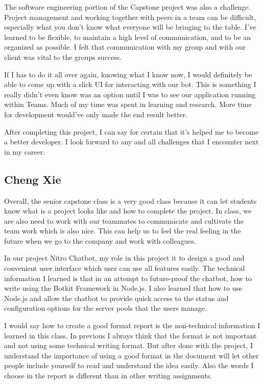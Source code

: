 \documentclass[onecolumn, draftclsnofoot,10pt, compsoc]{IEEEtran}
\begin{document}
    The software engineering portion of the Capstone project was also a challenge.
    Project management and working together with peers in a team can be difficult, especially what you don't know what everyone will be bringing to the table.
    I've learned to be flexible, to maintain a high level of communication, and to be an organized as possible.
    I felt that communication with my group and with our client was vital to the groups success.
    
    If I has to do it all over again, knowing what I know now, I would definitely be able to come up with a slick UI for interacting with our bot.
    This is something I really didn't even know was an option until I was to see our application running within Teams.
    Much of my time was spent in learning and research. 
    More time for development would've only made the end result better.
    
    After completing this project, I can say for certain that it's helped me to become a better developer.
    I look forward to any and all challenges that I encounter next in my career.

\subsection{Cheng Xie}
    Overall, the senior capstone class is a very good class because it can let students know what is a project looks like and how to complete the project. In class, we are also need to work with our teammates to communicate and cultivate the team work which is also nice. This can help us to feel the real feeling in the future when we go to the company and work with colleagues.
    
    In our project Nitro Chatbot, my role in this project it to design a good and convenient user interface which user can use all features easily. The technical information I learned is that in an attempt to future-proof the chatbot, how to write using the Botkit Framework in Node.js. I also learned that how to use Node.js and allow the chatbot to provide quick access to the status and configuration options for the server pools that the users manage.
    
    I would say how to create a good format report is the non-technical information I learned in this class. In previous I always think that the format is not important and not using some technical writing format. But after done with the project, I understand the importance of using a good format in the document will let other people include yourself to read and understand the idea easily. Also the words I choose in the report is different than in other writing assignments.
    
\end{document}

